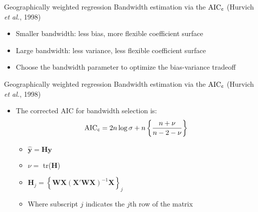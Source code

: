 \documentclass[12pt,t,handout]{beamer}
\newcommand{\subt}[1]{{\footnotesize \color{subtitle} {#1}}}
\begin{document}
\begin{frame}{Geographically weighted regression}
\subt{Bandwidth estimation via the $\text{AIC}_{\tt c}$ (Hurvich \emph{et al.}, 1998)}

\bigskip
\begin{itemize}
    \item Smaller bandwidth: less bias, more flexible coefficient surface
    \item Large bandwidth: less variance, less flexible coefficient surface
    \item Choose the bandwidth parameter to optimize the bias-variance tradeoff
\end{itemize}

\end{frame}





\begin{frame}{Geographically weighted regression}
\subt{Bandwidth estimation via the $\text{AIC}_{\tt c}$ (Hurvich \emph{et al.}, 1998)}

\bigskip
\begin{itemize}
    \item The corrected AIC for bandwidth selection is:
    \begin{align*}
      \text{AIC}_{\tt c} = 2 n \log{\sigma} + n \left\{\frac{n + \nu}{n - 2 - \nu}\right\}
    \end{align*}
    \begin{itemize}
        \item $\hat{\bm{y}} = \bm{H}\bm{y}$
        \item $\nu = $ tr($\bm{H}$)
        \item $\bm{H}_j = \left\{\bm{W}\bm{X}(\bm{X}'\bm{W}\bm{X})^{-1}\bm{X}\right\}_j$
        \item Where subscript $j$ indicates the $j$th row of the matrix
    \end{itemize}
\end{itemize}

\end{frame}
\end{document}
